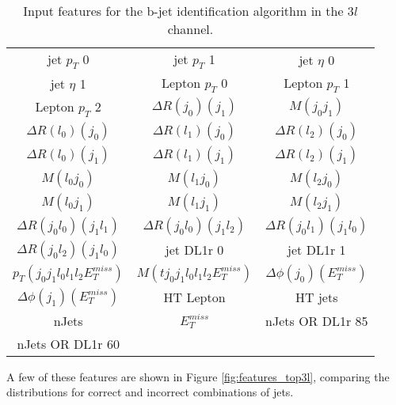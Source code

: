 \begin{table}[H]
  \begin{center}
  \begin{tabular}{ccc}
  \hline\hline
    jet  $p_T$ 0 & jet  $p_T$ 1 & jet  $\eta$ 0 \\
    jet  $\eta$ 1 & Lepton  $p_T$ 0 & Lepton  $p_T$ 1 \\
    Lepton  $p_T$ 2 & $\Delta R(j_0)(j_1)$ & $M(j_0j_1)$ \\
    $\Delta R(l_0)(j_0)$ & $\Delta R(l_1)(j_0)$ & $\Delta R(l_2)(j_0)$ \\
    $\Delta R(l_0)(j_1)$ & $\Delta R(l_1)(j_1)$ & $\Delta R(l_2)(j_1)$ \\
    $M(l_0j_0)$ & $M(l_1j_0)$ & $M(l_2j_0)$ \\
    $M(l_0j_1)$ & $M(l_1j_1)$ & $M(l_2j_1)$ \\
    $\Delta R(j_0l_0)(j_1l_1)$ & $\Delta R(j_0l_0)(j_1l_2)$ & $\Delta R(j_0l_1)(j_1l_0)$ \\
    $\Delta R(j_0l_2)(j_1l_0)$ & jet DL1r 0 & jet DL1r 1 \\
     $p_T(j_0j_1l_0l_1l_2E_T^{miss})$ & $M(tj_0j_1l_0l_1l_2E_T^{miss})$ & $\Delta\phi(j_0)(E_T^{miss})$ \\
    $\Delta\phi(j_1)(E_T^{miss})$ & HT Lepton & HT jets \\
    nJets & $E_T^{miss}$ & nJets OR DL1r 85 \\
    nJets OR DL1r 60 & & \\
    \hline
  \end{tabular}
  \end{center}
  \caption{Input features for the b-jet identification algorithm in the $3l$  channel.}
  \label{tab:top3lfeatures}
\end{table}

A few of these features are shown in Figure \ref{fig:features_top3l}, comparing the distributions for correct and incorrect combinations of jets.


